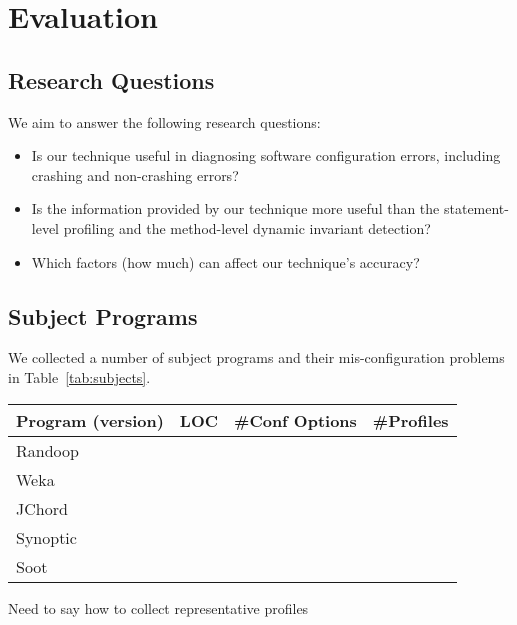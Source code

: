 \section{Evaluation}
\label{sec:evaluation}

\subsection{Research Questions}

We aim to answer the following research questions:

\begin{itemize}
\item Is our technique useful in diagnosing software configuration errors, including
crashing and non-crashing errors?
\item Is the information provided by our technique more useful than the statement-level
profiling and the method-level dynamic invariant detection?
\item Which factors (how much) can affect our technique's accuracy?
\end{itemize}

\subsection{Subject Programs}

We collected a number of subject programs and their mis-configuration problems in
Table~\ref{tab:subjects}.

\begin{table}[t]
\begin{tabular}{lccc}
\hline
 Program (version) & LOC & \#Conf Options & \#Profiles\\
 \hline
 \hline
 Randoop & & & \\
 Weka &  & & \\
 JChord & & & \\
 Synoptic & && \\
 Soot &  &  & \\
\hline
\end{tabular}


\end{table}

Need to say how to collect representative profiles

